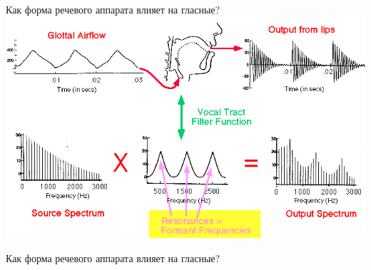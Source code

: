 \begin{frame}{Как форма речевого аппарата влияет на гласные?}
\includegraphics[width=0.95\linewidth]{01-source-filter.png}
\end{frame}

\begin{frame}{Как форма речевого аппарата влияет на гласные?}
\Large
\vfill
\begin{center}
\begin{vowel}
\end{vowel}
\end{center}
\vfill
\end{frame}

